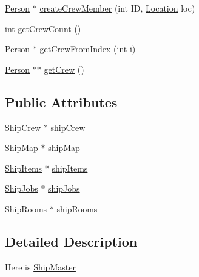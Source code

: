 \begin{DoxyCompactItemize}
\item 
\hyperlink{classPerson}{Person} $\ast$ \hyperlink{classShipMaster_af1e9d8713eb387b216cc80e11728ce4d}{create\-Crew\-Member} (int I\-D, \hyperlink{structLocation}{Location} loc)
\item 
int \hyperlink{classShipMaster_a49b39499c31975773052fa6c162000ed}{get\-Crew\-Count} ()
\item 
\hyperlink{classPerson}{Person} $\ast$ \hyperlink{classShipMaster_a0fa00005b82784c63799552a3a29bdb0}{get\-Crew\-From\-Index} (int i)
\item 
\hyperlink{classPerson}{Person} $\ast$$\ast$ \hyperlink{classShipMaster_a99b6b1f1035358b6083b3df3c7e52024}{get\-Crew} ()
\end{DoxyCompactItemize}
\subsection*{Public Attributes}
\begin{DoxyCompactItemize}
\item 
\hyperlink{classShipCrew}{Ship\-Crew} $\ast$ \hyperlink{classShipMaster_a7f0c72b72e582c85dd582a1ffdceabdb}{ship\-Crew}
\item 
\hyperlink{classShipMap}{Ship\-Map} $\ast$ \hyperlink{classShipMaster_ad9033bf87a43b439646616bbc92dfe03}{ship\-Map}
\item 
\hyperlink{classShipItems}{Ship\-Items} $\ast$ \hyperlink{classShipMaster_a9eedfb4e38a7b7db557ce2d1330bfe4e}{ship\-Items}
\item 
\hyperlink{classShipJobs}{Ship\-Jobs} $\ast$ \hyperlink{classShipMaster_a1a204eb61598354bc650c3322d132a33}{ship\-Jobs}
\item 
\hyperlink{classShipRooms}{Ship\-Rooms} $\ast$ \hyperlink{classShipMaster_a8a39f20c1107f8d6f6c081817e40dbfd}{ship\-Rooms}
\end{DoxyCompactItemize}


\subsection{Detailed Description}
Here is \hyperlink{classShipMaster}{Ship\-Master} 


